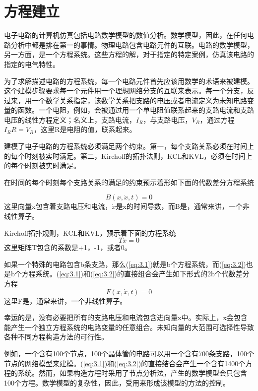 \chapter{方程建立}
\label{chap:3}
电子电路的计算机仿真包括电路数学模型的数值分析。数学模型，因此，在任何电路分析中都是排在第一的事情。物理电路包含电路元件的互联。电路的数学模型，另一方面，是一个方程系统。这些方程的解，对于指定的特定案例，仿真该电路的指定的电气特性。

为了求解描述电路的方程系统，每一个电路元件首先应该用数学的术语来被建模。这个建模步骤要求每一个元件用一个理想网络分支的互联来表示。每一个分支，反过来，用一个数学关系指定，该数学关系把支路的电压或者电流定义为未知电路变量的函数。一个电阻，例如，会被通过用一个单电阻值联系起来的支路电流和支路电压的线性方程定义；名义上，支路电流，$I_R$，与支路电压，$V_R$，通过方程$I_R R = V_R$，这里R是电阻的值，联系起来。

建模了电子电路的方程系统必须满足两个约束。第一，每个支路关系必须在时间上的每个时刻被实时满足。第二，Kirchoff的拓扑法则，KCL和KVL，必须在时间上的每个时刻被实时满足。

在时间的每个时刻每个支路关系的满足的约束预示着形如下面的代数差分方程系统

\begin{equation}
    B(x,\dot{x},t)=0
    \label{eq:3.1}
\end{equation}
这里向量x包含着支路电压和电流，$\dot{x}$是x的时间导数，而B是，通常来讲，一个非线性算子。

Kirchoff拓扑规则，KCL和KVL，预示着下面的方程系统
\begin{equation}
    T x = 0
    \label{eq:3.2}
\end{equation}
这里矩阵T包含的系数是+1，-1，或者0。

如果一个特殊的电路包含b条支路，那么(\ref{eq:3.1})就是b个方程系统，而(\ref{eq:3.2})也是b个方程系统\cite{ref-7}。(\ref{eq:3.1})和(\ref{eq:3.2})的直接组合会产生如下形式的2b个代数差分方程
\begin{equation}
    F(x,\dot{x},t)=0
    \label{eq:3.3}
\end{equation}
这里F是，通常来讲，一个非线性算子。

幸运的是，没有必要把所有的支路电压和电流包含进向量x中。实际上，x会包含能产生一个独立方程系统的电路变量的任意组合。未知向量的大范围可选择性导致各种不同方程构造方法的可行性。

例如，一个含有100个节点，100个晶体管的电路可以用一个含有700条支路，100个节点的网络模型来建模。(\ref{eq:3.1})和(\ref{eq:3.2})的直接结合会产生一个含有1400个方程的系统。然而，如果构造方程时采用了节点分析法，产生的数学模型会只包含100个方程。数学模型的复杂性，因此，受用来形成该模型的方法的控制。

